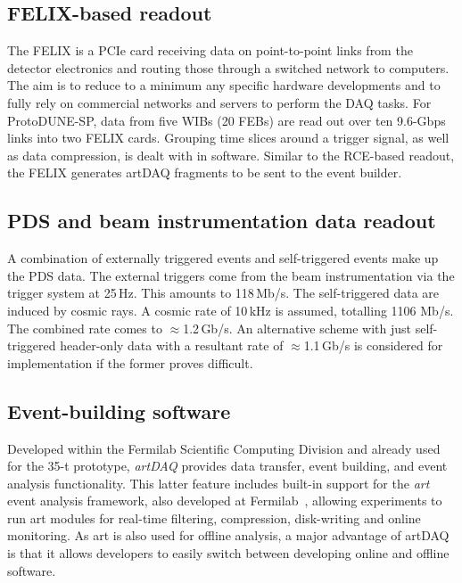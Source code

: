 \subsection{FELIX-based readout}
The FELIX is a PCIe card receiving data on point-to-point links from
the detector electronics and routing those through a switched network
to computers.  The aim is to reduce to a minimum any specific hardware
developments and to fully rely on commercial networks and servers to
perform the DAQ tasks.  For ProtoDUNE-SP, data from five WIBs (20 FEBs) are read out over ten 9.6-Gbps links into two FELIX cards.  Grouping
time slices around a trigger signal, as well as data compression, is
dealt with in software. Similar to the RCE-based readout, the FELIX 
generates artDAQ fragments to be sent to the event builder.


\subsection{PDS and beam instrumentation data readout}
\label{subsec:pds-readout}

A combination of externally triggered events
and self-triggered events make up the PDS data.  The external triggers
come from the beam instrumentation via the trigger system at 25\,Hz.
This amounts to 118\,Mb/s.  The self-triggered data
are induced by cosmic rays.  A cosmic rate of 10\,kHz is assumed,
totalling 1106 Mb/s.
The combined rate comes to $\approx$1.2\,Gb/s.  An alternative scheme with
just self-triggered header-only data with a resultant rate of $\approx$1.1\,Gb/s is considered for implementation if
the former proves difficult.


\subsection{Event-building software }
\label{sec:daq-ev-build}

Developed within the Fermilab Scientific Computing Division and
already used for the 35-t prototype, \textit{artDAQ} provides data
transfer, event building, and event analysis functionality. This
latter feature includes built-in support for the \textit{art} event analysis
framework,
also developed at Fermilab~\cite{fnal:art}, allowing experiments to run art modules for real-time
filtering, compression, disk-writing and online monitoring. As art is also used for offline analysis, a major
advantage of artDAQ is that it allows developers to easily switch
between developing online and offline software.


